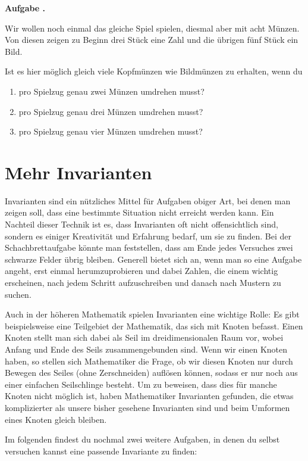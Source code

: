 \documentclass[a4paper,ngerman,12pt]{scrartcl}
\theoremstyle{definition}
\theoremstyle{plain}
\theoremstyle{remark}
\newlength{\aufgabenskip}
\newcounter{aufgabennummer}
\newenvironment{aufgabe}[1]{
	\addtocounter{aufgabennummer}{1}
	\textbf{Aufgabe \theaufgabennummer.} \emph{#1} \par
}{\vspace{\aufgabenskip}}
\begin{document}
\begin{aufgabe}{}
	Wir wollen noch einmal das gleiche Spiel spielen, diesmal aber mit acht Münzen. Von diesen zeigen zu Beginn drei Stück eine Zahl und die übrigen fünf Stück ein Bild.
	
	Ist es hier möglich gleich viele Kopfmünzen wie Bildmünzen zu erhalten, wenn du
	\begin{enumerate}
		\item pro Spielzug genau zwei Münzen umdrehen musst?
		\item pro Spielzug genau drei Münzen umdrehen musst?
		\item pro Spielzug genau vier Münzen umdrehen musst?
	\end{enumerate}
\end{aufgabe}


\section{Mehr Invarianten}

Invarianten sind ein nützliches Mittel für Aufgaben obiger Art, bei denen man zeigen soll, dass eine bestimmte Situation nicht erreicht werden kann. Ein Nachteil dieser Technik ist es, dass Invarianten oft nicht offensichtlich sind, sondern es einiger Kreativität und Erfahrung bedarf, um sie zu finden. Bei der Schachbrettaufgabe könnte man feststellen, dass am Ende jedes Versuches zwei schwarze Felder übrig bleiben. Generell bietet sich an, wenn man so eine Aufgabe angeht, erst einmal herumzuprobieren und dabei Zahlen, die einem wichtig erscheinen, nach jedem Schritt aufzuschreiben und danach nach Mustern zu suchen.

Auch in der höheren Mathematik spielen Invarianten eine wichtige Rolle: Es gibt beispielsweise eine Teilgebiet der Mathematik, das sich mit Knoten befasst. Einen Knoten stellt man sich dabei als Seil im dreidimensionalen Raum vor, wobei Anfang und Ende des Seils zusammengebunden sind. Wenn wir einen Knoten haben, so stellen sich Mathematiker die Frage, ob wir diesen Knoten nur durch Bewegen des Seiles (ohne Zerschneiden) auflösen können, sodass er nur noch aus einer einfachen Seilschlinge besteht. Um zu beweisen, dass dies für manche Knoten nicht möglich ist, haben Mathematiker Invarianten gefunden, die etwas komplizierter als unsere bisher gesehene Invarianten sind und beim Umformen eines Knoten gleich bleiben.

Im folgenden findest du nochmal zwei weitere Aufgaben, in denen du selbst versuchen kannst eine passende Invariante zu finden:
\end{document}
